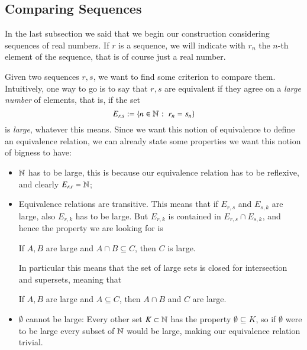 \documentclass[adraft, copyright,creativecommons,sharealike,noncommercial]{Preambles/eptcs}
\begin{document}
\subsection{Comparing Sequences}
In the last subsection we said that we begin our construction considering sequences of real numbers. If $r$ is a sequence, we will indicate with $r_n$ the $n$-th element of the sequence, that is of course just a real number.

Given two sequences $r, s$, we want to find some criterion to compare them. Intuitively, one way to go is to say that $r, s$ are equivalent if they agree on a \emph{large number} of elements, that is, if the set
\begin{equation*}
	E_{r,s} := \left\{n \in \mathbb{N} \: \colon \: r_n = s_n\right\}
\end{equation*}
is \emph{large}, whatever this means. Since we want this notion of equivalence to define an equivalence relation, we can already state some properties we want this notion of bigness to have:
\begin{itemize}
	\item $\mathbb{N}$ has to be large, this is because our equivalence relation has to be reflexive, and clearly $E_{r,r} = \mathbb{N}$;
	\item Equivalence relations are transitive. This means that if $E_{r,s}$ and $E_{s,k}$ are large, also $E_{r,k}$ has to be large. But $E_{r,k}$ is contained in $E_{r,s} \cap E_{s,k}$, and hence the property we are looking for is 
	\begin{center}
		If $A, B$ are large and $A \cap B \subseteq C$, then $C$ is large.
	\end{center}
	In particular this means that the set of large sets is closed for intersection and supersets, meaning that
	\begin{center}
		If $A,B$ are large and $A \subseteq C$, then $A \cap B$ and $C$ are large. 
	\end{center} 
	\item $\emptyset$ cannot be large: Every other set $K \subset \mathbb{N}$ has the property $\emptyset \subseteq K$, so if $\emptyset$ were to be large every subset of $\mathbb{N}$ would be large, making our equivalence relation trivial.
\end{itemize}
\end{document}
